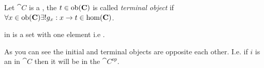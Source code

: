 \begin{definition}
\label{def:terminal_object}
Let $\cat{C}$ is a , the
 $t \in \mathrm{ob}(\mathbf{C})$ is called
\textit{terminal object} if $\forall x \in \mathrm{ob}(\mathbf{C})
\exists! g_x: x \to t \in \mathrm{hom}(\mathbf{C})$.
\end{definition}

\begin{example}
\label{ex:set_terminal_object}
 in  is a set
with one element i.e . 
\end{example}

As you can see the initial and terminal objects are opposite each
other. I.e. if $i$ is an  in $\cat{C}$
then it will be  in
the  $\cat{C^{op}}$.

